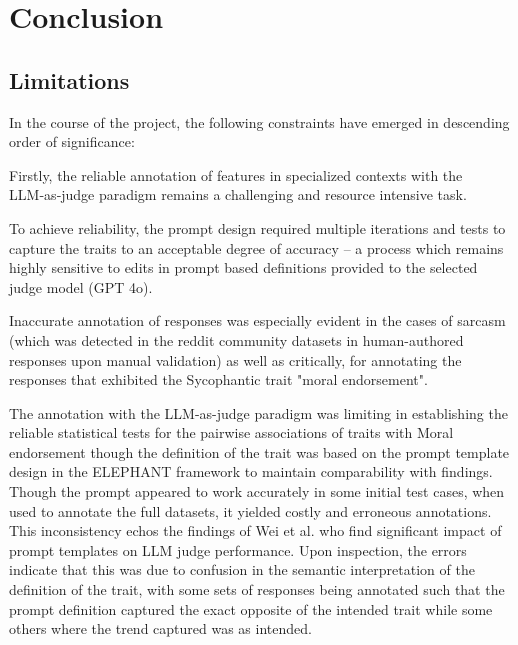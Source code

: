 \chapter{Conclusion}

\section{Limitations}\label{sec:limitations}

In the course of the project, the following constraints have emerged in descending order of significance:

Firstly, the reliable annotation of features in specialized contexts with the LLM‑as‑judge paradigm remains a challenging and resource intensive task.

To achieve reliability, the prompt design required multiple iterations and tests to capture the traits to an acceptable degree of accuracy – a process which remains highly sensitive to edits in prompt based definitions provided to the selected judge model (GPT 4o). 

\bigskip Inaccurate annotation of responses was especially evident in the cases of sarcasm (which was detected in the reddit community datasets in human-authored responses upon manual validation) as well as critically, for annotating the responses that exhibited the Sycophantic trait "moral endorsement".

The annotation with the LLM-as-judge paradigm was limiting in establishing the reliable statistical tests for the pairwise associations of traits with Moral endorsement though the definition of the trait was based on the prompt template design in the ELEPHANT framework \cite{cheng-etal-sycophancy} to maintain comparability with findings. Though the prompt appeared to work accurately in some initial test cases, when used to annotate the full datasets, it yielded costly and erroneous annotations. This inconsistency echos the findings of Wei et al. \cite{llm-judge} who find significant impact of prompt templates on LLM judge performance.
Upon inspection, the errors indicate that this was due to confusion in the semantic interpretation of the definition of the trait, with some sets of responses being annotated such that the prompt definition captured the exact opposite of the intended trait while some others where the trend captured was as intended. 


